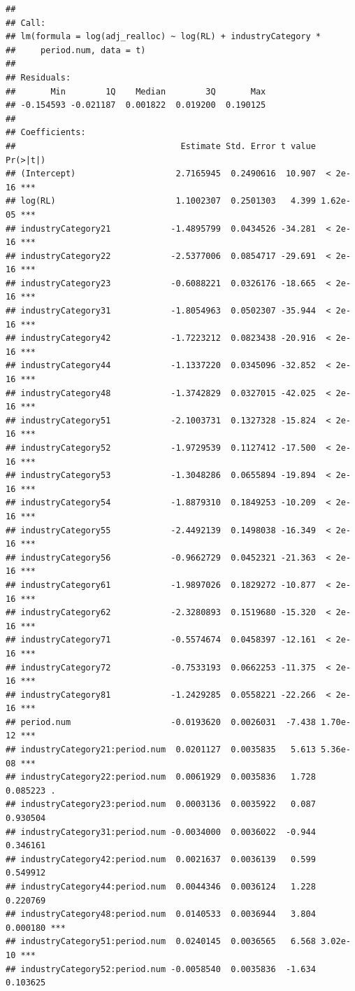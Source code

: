 \documentclass[
]{article}
\begin{document}
\begin{verbatim}
## 
## Call:
## lm(formula = log(adj_realloc) ~ log(RL) + industryCategory * 
##     period.num, data = t)
## 
## Residuals:
##       Min        1Q    Median        3Q       Max 
## -0.154593 -0.021187  0.001822  0.019200  0.190125 
## 
## Coefficients:
##                                 Estimate Std. Error t value Pr(>|t|)    
## (Intercept)                    2.7165945  0.2490616  10.907  < 2e-16 ***
## log(RL)                        1.1002307  0.2501303   4.399 1.62e-05 ***
## industryCategory21            -1.4895799  0.0434526 -34.281  < 2e-16 ***
## industryCategory22            -2.5377006  0.0854717 -29.691  < 2e-16 ***
## industryCategory23            -0.6088221  0.0326176 -18.665  < 2e-16 ***
## industryCategory31            -1.8054963  0.0502307 -35.944  < 2e-16 ***
## industryCategory42            -1.7223212  0.0823438 -20.916  < 2e-16 ***
## industryCategory44            -1.1337220  0.0345096 -32.852  < 2e-16 ***
## industryCategory48            -1.3742829  0.0327015 -42.025  < 2e-16 ***
## industryCategory51            -2.1003731  0.1327328 -15.824  < 2e-16 ***
## industryCategory52            -1.9729539  0.1127412 -17.500  < 2e-16 ***
## industryCategory53            -1.3048286  0.0655894 -19.894  < 2e-16 ***
## industryCategory54            -1.8879310  0.1849253 -10.209  < 2e-16 ***
## industryCategory55            -2.4492139  0.1498038 -16.349  < 2e-16 ***
## industryCategory56            -0.9662729  0.0452321 -21.363  < 2e-16 ***
## industryCategory61            -1.9897026  0.1829272 -10.877  < 2e-16 ***
## industryCategory62            -2.3280893  0.1519680 -15.320  < 2e-16 ***
## industryCategory71            -0.5574674  0.0458397 -12.161  < 2e-16 ***
## industryCategory72            -0.7533193  0.0662253 -11.375  < 2e-16 ***
## industryCategory81            -1.2429285  0.0558221 -22.266  < 2e-16 ***
## period.num                    -0.0193620  0.0026031  -7.438 1.70e-12 ***
## industryCategory21:period.num  0.0201127  0.0035835   5.613 5.36e-08 ***
## industryCategory22:period.num  0.0061929  0.0035836   1.728 0.085223 .  
## industryCategory23:period.num  0.0003136  0.0035922   0.087 0.930504    
## industryCategory31:period.num -0.0034000  0.0036022  -0.944 0.346161    
## industryCategory42:period.num  0.0021637  0.0036139   0.599 0.549912    
## industryCategory44:period.num  0.0044346  0.0036124   1.228 0.220769    
## industryCategory48:period.num  0.0140533  0.0036944   3.804 0.000180 ***
## industryCategory51:period.num  0.0240145  0.0036565   6.568 3.02e-10 ***
## industryCategory52:period.num -0.0058540  0.0035836  -1.634 0.103625    

\end{verbatim}
\end{document}
